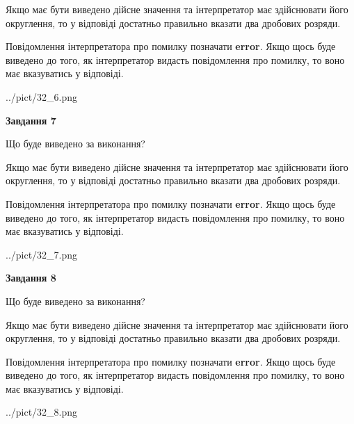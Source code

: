 \documentclass[12pt, ukrainian]{article}
\begin{document}
{\begin {Large}
Якщо має бути виведено дійсне значення та інтерпретатор має здійснювати його округлення, 
то у відповіді достатньо правильно вказати два дробових розряди.

Повідомлення інтерпретатора про помилку позначати \textbf{error}.
Якщо щось буде виведено до того, як інтерпретатор видасть повідомлення про помилку, 
то воно має вказуватись у відповіді. \par

\begin{center}
	{../pict/32_6.png}
\end{center}
\newpage

{\begin {center}\textbf{Завдання 7}\end {center}}\par
Що буде виведено за виконання? \par

Якщо має бути виведено дійсне значення та інтерпретатор має здійснювати його округлення, 
то у відповіді достатньо правильно вказати два дробових розряди.

Повідомлення інтерпретатора про помилку позначати \textbf{error}.
Якщо щось буде виведено до того, як інтерпретатор видасть повідомлення про помилку, 
то воно має вказуватись у відповіді. \par

\begin{center}
	{../pict/32_7.png}
\end{center}
\newpage

{\begin {center}\textbf{Завдання 8}\end {center}}\par
Що буде виведено за виконання? \par

Якщо має бути виведено дійсне значення та інтерпретатор має здійснювати його округлення, 
то у відповіді достатньо правильно вказати два дробових розряди.

Повідомлення інтерпретатора про помилку позначати \textbf{error}.
Якщо щось буде виведено до того, як інтерпретатор видасть повідомлення про помилку, 
то воно має вказуватись у відповіді. \par

\begin{center}
	{../pict/32_8.png}
\end{center}
\newpage


\end{Large}}
\end{document}
